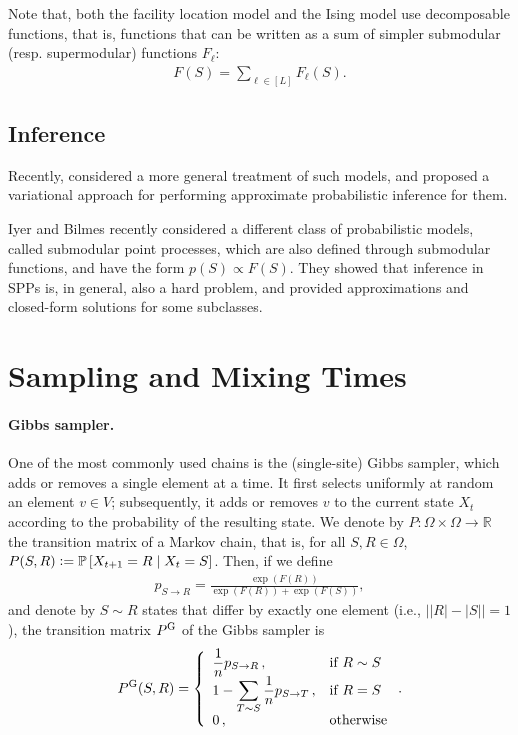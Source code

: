 \begin{example}[\fldc{}]
\citep{djolonga16mixed}
\end{example}

Note that, both the facility location model and the Ising model use decomposable functions, that is, functions that can be written as a sum of simpler submodular (resp. supermodular) functions $F_{\ell}$:
\begin{align} \label{eq:fdec}
F(S) = \sum_{\ell \in [L]} F_{\ell}(S).
\end{align}


\subsection{Inference}

Recently, \citet{djolonga14} considered a more general treatment of such models, and proposed a variational approach for performing approximate probabilistic inference for them.



Iyer and Bilmes \citep{iyer15} recently considered a different class of probabilistic models, called submodular point processes, which are also defined through submodular functions, and have the form $p(S) \propto F(S)$.
They showed that inference in SPPs is, in general, also a hard problem, and provided approximations and closed-form solutions for some subclasses.


\section{Sampling and Mixing Times}

\paragraph{Gibbs sampler.}
One of the most commonly used chains is the (single-site) Gibbs sampler, which adds or removes a single element %
at a time.
It first selects uniformly at random an element $v \in V$; subsequently, it adds or removes $v$ to the current state $X_t$ according to the probability of the resulting state.
We denote by $P : \Omega \times \Omega \to \mathbb{R}$ the transition matrix of a Markov chain, that is, for all $S, R \in \Omega$, $P(S, R) \vcentcolon= \mathbb{P}\left[ X_{t+1} = R \mid X_t = S \right]$.
Then, if we define
\begin{align*}
p_{S \rightarrow R} = \displaystyle\frac{\exp(F(R))}{\exp(F(R)) + \exp(F(S))},
\end{align*}
and denote by $S \sim R$ states that differ by exactly one element (i.e., $\big||R| - |S|\big| = 1$),
the transition matrix $P^{\mathrm{G}}$ of the Gibbs sampler is
\begin{align*}
  P^{\mathrm{G}}(S, R) = 
  \left\{ \begin{array}{ll} \displaystyle\frac{1}{n}p_{S \rightarrow R}\,,& \mbox{if } R \sim S \\ 1 - \displaystyle\sum_{T \sim S} \displaystyle\frac{1}{n}p_{S \rightarrow T}\,,& \mbox{if } R = S \\ 0\,,& \mbox{otherwise} \end{array} \right..
\end{align*}

